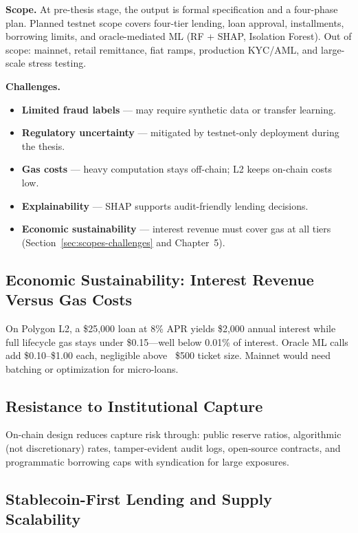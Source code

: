 \documentclass[12pt,a4paper]{report}
\begin{document}
\textbf{Scope.} At pre-thesis stage, the output is formal specification and a four-phase plan. Planned testnet scope covers four-tier lending, loan approval, installments, borrowing limits, and oracle-mediated ML (RF + SHAP, Isolation Forest). Out of scope: mainnet, retail remittance, fiat ramps, production KYC/AML, and large-scale stress testing.

\textbf{Challenges.}
\begin{itemize}[noitemsep]
\item \textbf{Limited fraud labels} --- may require synthetic data or transfer learning.
\item \textbf{Regulatory uncertainty} --- mitigated by testnet-only deployment during the thesis.
\item \textbf{Gas costs} --- heavy computation stays off-chain; L2 keeps on-chain costs low.
\item \textbf{Explainability} --- SHAP supports audit-friendly lending decisions.
\item \textbf{Economic sustainability} --- interest revenue must cover gas at all tiers (Section~\ref{sec:scopes-challenges} and Chapter~5).
\end{itemize}

\subsection{Economic Sustainability: Interest Revenue Versus Gas Costs}

On Polygon L2, a \$25{,}000 loan at 8\% APR yields \$2{,}000 annual interest while full lifecycle gas stays under \$0.15---well below 0.01\% of interest. Oracle ML calls add \$0.10--\$1.00 each, negligible above ~\$500 ticket size. Mainnet would need batching or optimization for micro-loans.

\subsection{Resistance to Institutional Capture}

On-chain design reduces capture risk through: public reserve ratios, algorithmic (not discretionary) rates, tamper-evident audit logs, open-source contracts, and programmatic borrowing caps with syndication for large exposures.

\subsection{Stablecoin-First Lending and Supply Scalability}
\label{sec:stablecoin-first}
\end{document}
